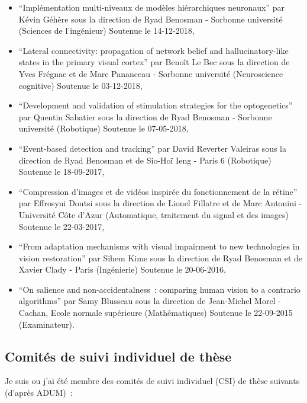 \documentclass[10pt,french,a4paper,oneside]{article}%
\begin{document}
\begin{itemize}
	\item ``Implémentation multi-niveaux de modèles hiérarchiques neuronaux'' par Kévin Géhère sous la direction de Ryad Benosman - Sorbonne université 	(Sciences de l'ingénieur) Soutenue le 14-12-2018,

	\item ``Lateral connectivity: propagation of network belief and hallucinatory-like states in the primary visual cortex'' par Benoît Le Bec sous la direction de Yves Frégnac et de Marc Pananceau - Sorbonne université (Neuroscience cognitive) Soutenue le 03-12-2018,

	\item ``Development and validation of stimulation strategies for the optogenetics'' par Quentin Sabatier sous la direction de Ryad Benosman - Sorbonne université (Robotique) Soutenue le 07-05-2018,

	\item ``Event-based detection and tracking'' par David Reverter Valeiras sous la direction de Ryad Benosman et de Sio-Hoï Ieng - Paris 6	(Robotique)	Soutenue le 18-09-2017,

	\item ``Compression d'images et de vidéos inspirée du fonctionnement de la rétine''	par Effrosyni Doutsi sous la direction de Lionel Fillatre et de Marc Antonini - Université Côte d'Azur	(Automatique, traitement du signal et des images) 	Soutenue le 22-03-2017,

	\item ``From adaptation mechanisms with visual impairment to new technologies in vision restoration'' par Sihem Kime sous la direction de Ryad Benosman et de Xavier Clady - Paris (Ingénierie) Soutenue le 20-06-2016,

	\item ``On salience and non-accidentalness~: comparing human vision to a contrario algorithms''  par Samy Blusseau sous la direction de Jean-Michel Morel - Cachan, Ecole normale supérieure (Mathématiques) Soutenue le 22-09-2015 (Examinateur).
\end{itemize} %
	

\subsection{Comités de suivi individuel de thèse} %

Je suis ou j'ai été membre des comités de suivi individuel (CSI) de thèse suivants (d'après ADUM)~:
\end{document}
